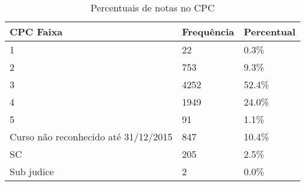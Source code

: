 \begin{table}[!htbp]
\centering
\begin{tabular}{@{}lll@{}}
\toprule
CPC Faixa                            & Frequência & Percentual \\ \midrule
1                                    & 22         & 0.3\%      \\
2                                    & 753        & 9.3\%      \\
3                                    & 4252       & 52.4\%     \\
4                                    & 1949       & 24.0\%     \\
5                                    & 91         & 1.1\%      \\
Curso não reconhecido até 31/12/2015 & 847        & 10.4\%     \\
SC                                   & 205        & 2.5\%      \\
Sub judice                           & 2          & 0.0\%      \\ \bottomrule
\end{tabular}
\caption{Percentuais de notas no CPC}
\label{tbl: cpc-faixa}
\end{table}
